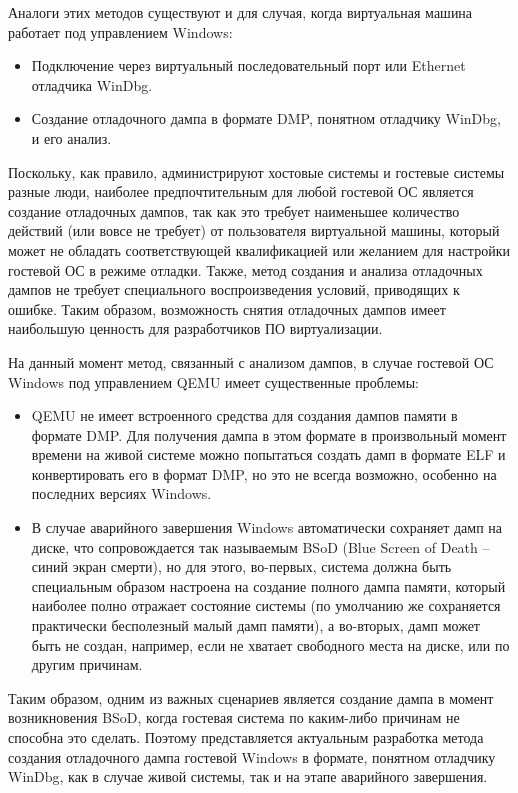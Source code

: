 \documentclass{mipt-thesis-bs}
\begin{document}
Аналоги этих методов существуют и для случая, когда виртуальная машина работает под управлением Windows:

\begin{itemize}
\item Подключение через виртуальный последовательный порт или Ethernet отладчика WinDbg\cite{qemu-win}.
\item Создание отладочного дампа в формате DMP, понятном отладчику WinDbg, и его анализ.
\end{itemize}

Поскольку, как правило, администрируют хостовые системы и гостевые системы разные люди, наиболее предпочтительным для любой гостевой ОС является создание отладочных дампов, так как это требует наименьшее количество действий (или вовсе не требует) от пользователя виртуальной машины, который может не обладать соответствующей квалификацией или желанием для настройки гостевой ОС в режиме отладки. Также, метод создания и анализа отладочных дампов не требует специального воспроизведения условий, приводящих к ошибке. Таким образом, возможность снятия отладочных дампов имеет наибольшую ценность для разработчиков ПО виртуализации.

На данный момент метод, связанный с анализом дампов, в случае гостевой ОС Windows под управлением QEMU имеет существенные проблемы:

\begin{itemize}
\item QEMU не имеет встроенного средства для создания дампов памяти в формате DMP. Для получения дампа в этом формате в произвольный момент времени на живой системе можно попытаться создать дамп в формате ELF и конвертировать его в формат DMP, но это не всегда возможно, особенно на последних версиях Windows.
\item В случае аварийного завершения Windows автоматически сохраняет дамп на диске, что сопровождается так называемым BSoD (Blue Screen of Death -- синий экран смерти), но для этого, во-первых, система должна быть специальным образом настроена на создание полного дампа памяти, который наиболее полно отражает состояние системы (по умолчанию же сохраняется практически бесполезный малый дамп памяти), а во-вторых, дамп может быть не создан, например, если не хватает свободного места на диске, или по другим причинам\cite{nodump}.
\end{itemize}

Таким образом, одним из важных сценариев является создание дампа в момент возникновения BSoD, когда гостевая система по каким-либо причинам не способна это сделать. Поэтому представляется актуальным разработка метода создания отладочного дампа гостевой Windows в формате, понятном отладчику WinDbg, как в случае живой системы, так и на этапе аварийного завершения.
\end{document}

